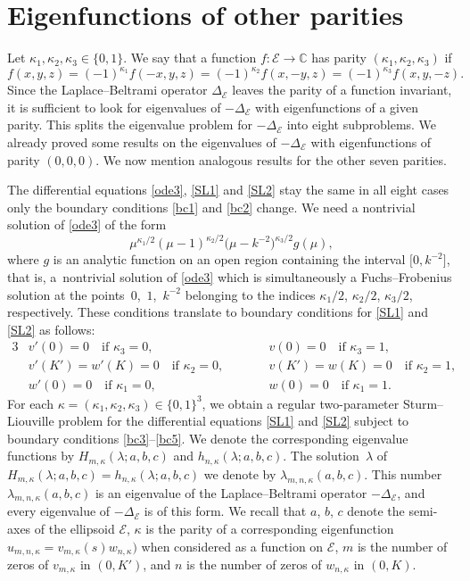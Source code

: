 \documentclass[10pt,a4paper]{amsart}
\newcommand{\C}{\mathbb{C}}
\newcommand{\E}{\mathcal{E}}
\newcommand{\D}{\Delta_\E}
\numberwithin{equation}{section}
\begin{document}
\section{Eigenfunctions of other parities}\label{other}

Let $\kappa_1,\kappa_2,\kappa_3\in\{0,1\}$. We say that a function $f\colon \E\to\C$ has parity $(\kappa_1,\kappa_2,\kappa_3)$
if
\[ f(x,y,z)=(-1)^{\kappa_1}f(-x,y,z)=(-1)^{\kappa_2}f(x,-y,z)=(-1)^{\kappa_3}f(x,y,-z).\]
Since the Laplace--Beltrami operator $\D$ leaves the parity of a function invariant, it is
sufficient to look for eigenvalues of $-\D$ with eigenfunctions of a given parity.
This splits the eigenvalue problem for $-\D$ into eight subproblems.
We already proved some results on the eigenvalues of $-\D$ with eigenfunctions of parity $(0,0,0)$.
We now mention analogous results for the other seven parities.

The differential equations \eqref{ode3}, \eqref{SL1} and \eqref{SL2} stay the same in all eight cases only the boundary conditions \eqref{bc1} and \eqref{bc2} change.
We need a nontrivial solution of \eqref{ode3} of the form
\[ \mu^{\kappa_1/2}(\mu-1)^{\kappa_2/2}\bigl(\mu-k^{-2}\bigr)^{\kappa_3/2} g(\mu),\]
where $g$ is an analytic function on an open region containing the interval $\bigl[0,k^{-2}\bigr]$, that is,
a~nontrivial solution of \eqref{ode3} which is simultaneously a Fuchs--Frobenius solution at the points~$0$,~$1$,~$k^{-2}$
belonging to the indices $\kappa_1/2$, $\kappa_2/2$, $\kappa_3/2$, respectively.
These conditions translate to boundary conditions for \eqref{SL1} and \eqref{SL2}
as follows:
\begin{alignat}{3}
&v'(0)=0 \quad \text{if $\kappa_3=0$}, && v(0)=0 \quad \text{if $\kappa_3=1$}\label{bc3}, &\\
&v'(K')=w'(K)=0 \quad \text{if $\kappa_2=0$},\qquad && v(K')=w(K)=0 \quad \text{if $\kappa_2=1$}\label{bc4}, &\\
&w'(0)=0 \quad \text{if $\kappa_1=0$}, && w(0)=0 \quad \text{if $\kappa_1=1$}.\label{bc5} &
\end{alignat}
For each $\kappa=(\kappa_1,\kappa_2,\kappa_3)\in\{0,1\}^3$, we obtain a regular two-parameter Sturm--Liouville problem for the differential equations \eqref{SL1} and \eqref{SL2} subject to boundary conditions \eqref{bc3}--\eqref{bc5}.
We denote the corresponding eigenvalue functions by $H_{m,\kappa}(\lambda;a,b,c)$ and $h_{n,\kappa}(\lambda;a,b,c)$.
The solution~$\lambda$ of $H_{m,\kappa}(\lambda;a,b,c)=h_{n,\kappa}(\lambda;a,b,c)$
we denote by $\lambda_{m,n,\kappa}(a,b,c)$. This number $\lambda_{m,n,\kappa}(a,b,c)$ is an eigenvalue of the Laplace--Beltrami operator $-\D$, and every eigenvalue of $-\D$ is of this form.
We recall that $a$, $b$, $c$ denote the semi-axes of the ellipsoid $\E$, $\kappa$ is the parity of a corresponding eigenfunction
$u_{m,n,\kappa}=v_{m,\kappa}(s)w_{n,\kappa})$ when considered as a function on $\E$,
$m$ is the number of zeros of $v_{m,\kappa}$ in $(0,K')$, and $n$ is the number of zeros of $w_{n,\kappa}$ in $(0,K)$.
\end{document}
